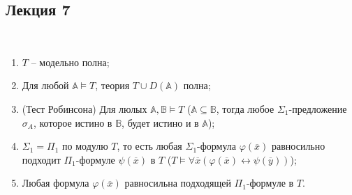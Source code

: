 \subsection{Лекция 7}

\begin{theorem} \  

    \begin{enumerate}
        \item $T$ -- модельно полна; 
        \item Для любой $\mathbb{A} \models T$, теория $T \cup D(\mathbb{A})$ полна; 
        \item (Тест Робинсона) Для люлых $\mathbb{A}, \mathbb{B} \models T$ ($\mathbb{A} \subseteq \mathbb{B}$, тогда любое $\Sigma_1$-предложение $\sigma_A$, которое истино в $\mathbb{B}$, будет истино и в $\mathbb{A}$); 
        \item $\Sigma_1 = \Pi_1$ по модулю $T$, то есть любая $\Sigma_1$-формула $\varphi(\overline{x})$ равносильно подходит $\Pi_1$-формуле $\psi(\overline{x})$ в $T$ ($T \models \forall \overline{x} (\varphi(\overline{x}) \leftrightarrow \psi (\overline{y}))$); 
        \item Любая формула $\varphi(\overline{x})$ равносильна подходящей $\Pi_1$-формуле в $T$.
    \end{enumerate}
\end{theorem}

